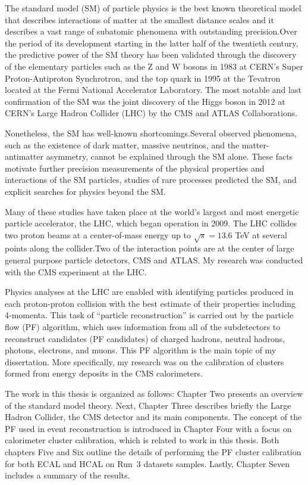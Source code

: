 
The standard model (SM) of particle physics %
is the best known theoretical model that describes interactions of matter at the smallest %
distance scales and it describes a vast range of subatomic phenomena with outstanding precision.Over the period of its development starting in the latter half of the twentieth century, the predictive power of the SM theory has been validated through the discovery of the elementary particles such as the Z and W bosons in 1983 at CERN's Super Proton-Antiproton Synchrotron, and the top quark in 1995 at the Tevatron located at the Fermi National Accelerator Laboratory. The most notable and last confirmation of the SM was the joint discovery of the Higgs boson in 2012 at CERN's Large Hadron Collider (LHC) by the CMS and ATLAS Collaborations.

Nonetheless, the SM has well-known shortcomings.Several observed phenomena, such as the existence of dark matter, massive neutrinos, and the matter-antimatter asymmetry, cannot be explained through the SM alone.
These facts motivate further precision measurements of the physical properties and interactions of the SM particles, studies of rare processes predicted the SM, and explicit searches for physics beyond the SM.

Many of these studies have taken place at the world's largest and most energetic particle accelerator, the LHC, which began operation in 2009. The LHC collides two proton beams at a center-of-mass energy up to $\sqrt{s}=13.6$ TeV at several points along the collider.Two of the interaction points are at the center of large general purpose particle detectors, CMS and ATLAS. My research was conducted with the CMS experiment at the LHC.

Physics analyses at the LHC are enabled with identifying particles produced in each proton-proton collision with the best estimate of their properties including 4-momenta.
This task of ``particle reconstruction'' is carried out by the particle flow (PF) algorithm, which uses information from all of the subdetectors
to reconstruct candidates (PF candidates) of charged hadrons, neutral hadrons, photons, electrons, and muons.
This PF algorithm is the main topic of my dissertation.
More specifically, my research was on the calibration of clusters formed from energy deposits in the CMS calorimeters.


The work in this thesis is organized as follows:
Chapter Two presents an overview of the standard model theory.
Next, Chapter Three describes briefly the Large Hadron Collider, the CMS detector and its main components.
The concept of the PF used in event reconstruction is introduced in Chapter Four with a focus on calorimeter cluster calibration, which is related to work in this thesis.
Both chapters Five and Six outline the details of performing the PF cluster calibration for both ECAL and HCAL on Run~3 datasets samples.
Lastly, Chapter Seven includes a summary of the results.
